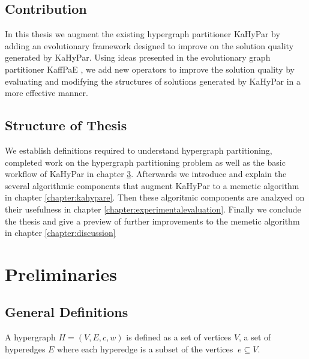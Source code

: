 \documentclass[a4paper,12pt,titlepage, BCOR7mm,headsepline]{scrbook}
\numberwithin{equation}{section}
\begin{document}
\section{Contribution}
In this thesis we augment the existing hypergraph partitioner KaHyPar \cite{schlag2016k} by adding an evolutionary framework designed to improve on the solution quality generated by KaHyPar. Using ideas presented in the evolutionary graph partitioner KaffPaE \cite{sanders2012distributed}, we add new operators to improve the solution quality by evaluating and modifying the structures of solutions generated by KaHyPar in a more effective manner. 
\section{Structure of Thesis}
We establish definitions required to understand hypergraph partitioning, completed work on the hypergraph partitioning problem as well as the basic workflow of KaHyPar in chapter \ref{chapter:preliminaries}.
Afterwards we introduce and explain the several algorithmic components that augment KaHyPar to a memetic algorithm in chapter \ref{chapter:kahypare}. 
Then these algoritmic components are analzyed on their usefulness in chapter \ref{chapter:experimentalevaluation}.
Finally we conclude the thesis and give a preview of further improvements to the memetic algorithm in chapter \ref{chapter:discussion}
\chapter{Preliminaries}
\label{chapter:preliminaries}
\section{General Definitions}

A hypergraph $H = (V, E, c, w)$ is defined as a set of vertices $V$, a set of hyperedges $E$ where each hyperedge is a subset of the vertices $\ e \subseteq V$.
\end{document}
